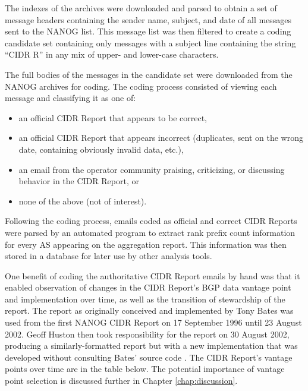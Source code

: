 The indexes of the archives were downloaded and parsed to obtain a set of message headers containing the sender name, subject, and date of all messages sent to the NANOG list. This message list was then filtered to create a coding candidate set containing only messages with a subject line containing the string ``CIDR R'' in any mix of upper- and lower-case characters.

The full bodies of the messages in the candidate set were downloaded from the NANOG archives for coding. The coding process consisted of viewing each message and classifying it as one of:

\begin{itemize}
\item{an official CIDR Report that appears to be correct,}
\item{an official CIDR Report that appears incorrect (duplicates, sent on the wrong date, containing obviously invalid data, etc.),}
\item{an email from the operator community praising, criticizing, or discussing behavior in the CIDR Report, or}
\item{none of the above (not of interest).}
\end{itemize}

Following the coding process, emails coded as official and correct CIDR Reports were parsed by an automated program to extract rank prefix count information for every AS appearing on the aggregation report. This information was then stored in a database for later use by other analysis tools.


One benefit of coding the authoritative CIDR Report emails by hand was that it enabled observation of changes in the CIDR Report's BGP data vantage point and implementation over time, as well as the transition of stewardship of the report. The report as originally conceived and implemented by Tony Bates was used from the first NANOG CIDR Report on 17 September 1996 until 23 August 2002. Geoff Huston then took responsibility for the report on 30 August 2002, producing a similarly-formatted report but with a new implementation that was developed without consulting Bates' source code \cite{Huston:2011ys}. The CIDR Report's vantage points over time are in the table below. The potential importance of vantage point selection is discussed further in Chapter \ref{chap:discussion}.

